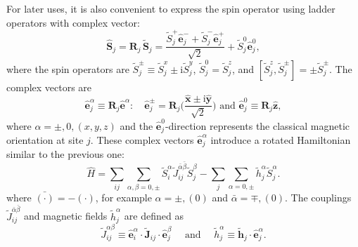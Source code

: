 \documentclass[aps, prx, nofootinbib, superscriptaddress]{revtex4-2}
\newcommand{\ri}{\mathrm{i}}
\begin{document}
For later uses, it is also convenient to express the spin operator using ladder operators with complex vector:
\begin{equation}\label{eq: Spin rotation-ladder}
    \hat{\mathbf{S}}_j = \mathbf{R}_j \, \widetilde{\mathbf{S}}_j
    = \frac{\widetilde{S}_{j}^{+} \hat{\mathbf{e}}^{-}_{j} + \widetilde{S}_{j}^{-} \hat{\mathbf{e}}^{+}_{j} }{\sqrt{2}} + \widetilde{S}^{0}_{j} \hat{\mathbf{e}}^{0}_{j},
\end{equation}
where the spin operators are $\widetilde{S}_{j}^{\pm} \equiv \widetilde{S}_{j}^{x} \pm \ri \widetilde{S}_{j}^{y}$, $\widetilde{S}^{0}_{j} = \widetilde{S}^{z}_{j}$, and $[\widetilde{S}^{z}_{j}, \widetilde{S}^{\pm}_{j}] = \pm \widetilde{S}^{\pm}_{j}$.
The complex vectors are
\begin{equation}
    \hat{\mathbf{e}}_{j}^{\alpha} \equiv \mathbf{R}_{j} \hat{\mathbf{e}}^{\alpha}: \quad 
    \hat{\mathbf{e}}^{\pm}_{j} = \mathbf{R}_{j} \Big( \frac{ \hat{\mathbf{x}} \pm \ri \hat{\mathbf{y}} }{\sqrt{2}} \Big)
    \text{ and }
    \hat{\mathbf{e}}_{j}^{0} \equiv \mathbf{R}_{j} \hat{\mathbf{z}},
\end{equation}
where $\alpha = \pm, 0, (x,y,z)$ and the $\hat{\mathbf{e}}_{j}^{0}$-direction represents the classical magnetic orientation at site $j$. 
These complex vectors $\hat{\mathbf{e}}_{j}^{\alpha}$ introduce a rotated Hamiltonian similar to the previous one:
\begin{equation}
    \hat{H} 
    = \sum_{ij} \sum_{\alpha, \beta = 0, \pm} 
    \widetilde{S}^{\alpha}_{i} \widetilde{J}^{\bar{\alpha}\bar{\beta}}_{ij} \widetilde{S}^{\beta}_{j} 
    - \sum_{j} \sum_{\alpha = 0, \pm} \widetilde{h}^{\alpha}_{j} \widetilde{S}^{\alpha}_{j}.
\end{equation}
where $\bar{(\cdot)} = - ( \cdot )$, for example $\alpha = \pm, (0)$ and $\bar{\alpha} = \mp, (0)$.
The couplings $\widetilde{J}^{\bar{\alpha}\bar{\beta}}_{ij}$ and magnetic fields $\widetilde{h}_{j}^{\alpha}$ are defined as 
\begin{equation}
    \widetilde{J}^{\alpha\beta}_{ij} \equiv \hat{\mathbf{e}}_{i}^{\alpha} \cdot \widetilde{\mathbf{J}}_{ij} \cdot \hat{\mathbf{e}}_{j}^{\beta}
    \quad \text{ and } \quad
    \widetilde{h}^{\alpha}_{j} \equiv \widetilde{\mathbf{h}}_{j} \cdot \hat{\mathbf{e}}^{\alpha}_{j}.
\end{equation}
\end{document}
